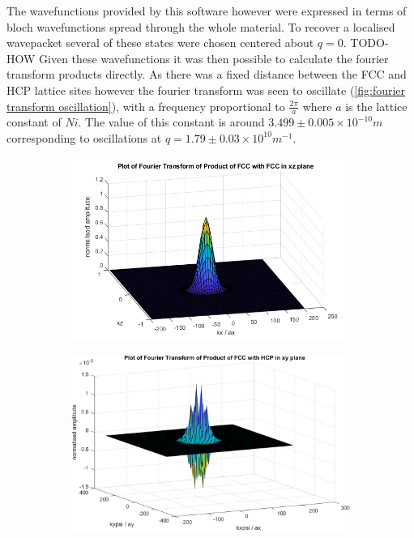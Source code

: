 The wavefunctions provided by this software however
were expressed in terms of bloch wavefunctions spread
through the whole material.
To recover a localised
wavepacket several of these states were chosen
centered about \(q=0\).
TODO-HOW
Given these wavefunctions
it was then possible to calculate the fourier
transform products directly. As there was a fixed
distance between the FCC and HCP lattice
sites however the fourier transform was seen to
oscillate (\cref{fig:fourier transform oscillation}), with a frequency proportional to
\(\frac{2\pi}{a}\) where \(a\) is the lattice
constant of \(Ni\). The value of this constant
is around \(3.499\pm{}0.005\times{}10^{-10}m\)~\cite{PhysRev.25.753}
corresponding to oscillations at
\(q = 1.79 \pm 0.03 \times{}10^{10}m^{-1}\).
\begin{figure}[htb]
  \centering
  \begin{subfigure}{0.45\linewidth}
    \centering
    \includegraphics[width= 0.9\linewidth]{Figures/Model/Plot of fourier transform of the wavefunction fccfcc xz plane.png}
    \label{fig:diagonal hydrogen matrix element no oscillation}
  \end{subfigure}
  \hfill
  \begin{subfigure}{0.45\linewidth}
    \centering
    \includegraphics[width= 0.9\linewidth]{Figures/Model/Plot of fourier transform of the wavefunction.png}

\end{subfigure}
\end{figure}
